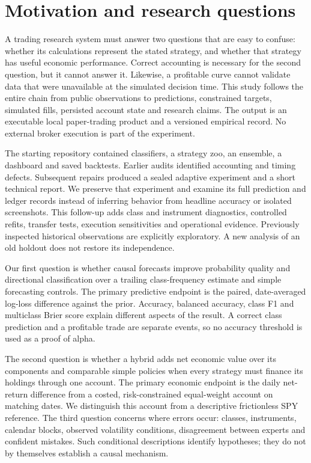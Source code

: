 \section{Motivation and research questions}\label{sec:section-01}

A trading research system must answer two questions that are easy to confuse: whether its calculations represent the stated strategy, and whether that strategy has useful economic performance. Correct accounting is necessary for the second question, but it cannot answer it. Likewise, a profitable curve cannot validate data that were unavailable at the simulated decision time. This study follows the entire chain from public observations to predictions, constrained targets, simulated fills, persisted account state and research claims. The output is an executable local paper-trading product and a versioned empirical record. No external broker execution is part of the experiment.

The starting repository contained classifiers, a strategy zoo, an ensemble, a dashboard and saved backtests. Earlier audits identified accounting and timing defects. Subsequent repairs produced a sealed adaptive experiment and a short technical report. We preserve that experiment and examine its full prediction and ledger records instead of inferring behavior from headline accuracy or isolated screenshots. This follow-up adds class and instrument diagnostics, controlled refits, transfer tests, execution sensitivities and operational evidence. Previously inspected historical observations are explicitly exploratory. A new analysis of an old holdout does not restore its independence.

Our first question is whether causal forecasts improve probability quality and directional classification over a trailing class-frequency estimate and simple forecasting controls. The primary predictive endpoint is the paired, date-averaged log-loss difference against the prior. Accuracy, balanced accuracy, class F1 and multiclass Brier score explain different aspects of the result. A correct class prediction and a profitable trade are separate events, so no accuracy threshold is used as a proof of alpha.

The second question is whether a hybrid adds net economic value over its components and comparable simple policies when every strategy must finance its holdings through one account. The primary economic endpoint is the daily net-return difference from a costed, risk-constrained equal-weight account on matching dates. We distinguish this account from a descriptive frictionless SPY reference. The third question concerns where errors occur: classes, instruments, calendar blocks, observed volatility conditions, disagreement between experts and confident mistakes. Such conditional descriptions identify hypotheses; they do not by themselves establish a causal mechanism.

